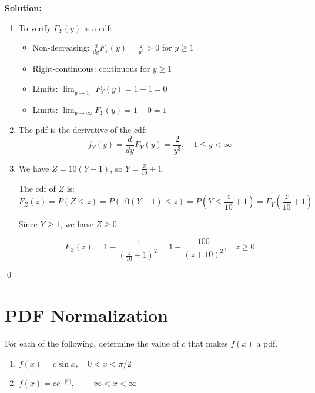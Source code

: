 \noindent\textbf{Solution:}
\begin{enumerate}[label=(\alph*)]
    \item To verify $F_Y(y)$ is a cdf:
    
    \begin{itemize}
    \item Non-decreasing: $\frac{d}{dy}F_Y(y) = \frac{2}{y^3} > 0$ for $y \geq 1$
    \item Right-continuous: continuous for $y \geq 1$
    \item Limits: $\lim_{y \to 1^+} F_Y(y) = 1 - 1 = 0$
    \item Limits: $\lim_{y \to \infty} F_Y(y) = 1 - 0 = 1$
    \end{itemize}
    
    \item The pdf is the derivative of the cdf:
    \[ f_Y(y) = \frac{d}{dy}F_Y(y) = \frac{2}{y^3}, \quad 1 \leq y < \infty \]
    
    \item We have $Z = 10(Y - 1)$, so $Y = \frac{Z}{10} + 1$.
    
    The cdf of $Z$ is:
    \[ F_Z(z) = P(Z \leq z) = P(10(Y - 1) \leq z) = P(Y \leq \frac{z}{10} + 1) = F_Y(\frac{z}{10} + 1) \]
    
    Since $Y \geq 1$, we have $Z \geq 0$.
    
    \[ F_Z(z) = 1 - \frac{1}{(\frac{z}{10} + 1)^2} = 1 - \frac{100}{(z + 10)^2}, \quad z \geq 0 \]
\end{enumerate}



\qed
\section{PDF Normalization}

\begin{problembox}
For each of the following, determine the value of $c$ that makes $f(x)$ a pdf.
\begin{enumerate}[label=(\alph*)]
    \item $f(x) = c \sin x, \quad 0 < x < \pi/2$
    \item $f(x) = ce^{-|x|}, \quad -\infty < x < \infty$
\end{enumerate}
\end{problembox}

